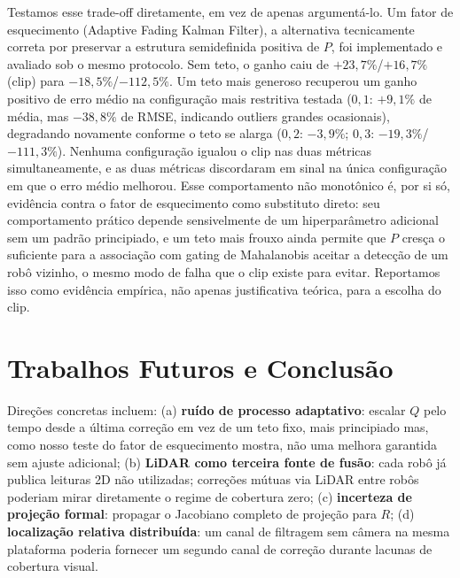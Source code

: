 \documentclass[runningheads]{llncs}
\renewcommand{\paragraph}[1]{\vspace{4pt}\noindent{\em #1}\enspace}
\begin{document}
Testamos esse trade-off diretamente, em vez de apenas argumentá-lo. Um
fator de esquecimento (Adaptive Fading Kalman Filter), a alternativa
tecnicamente correta por preservar a estrutura semidefinida positiva
de $P$, foi implementado e avaliado sob o mesmo protocolo. Sem teto, o
ganho caiu de $+23,7\%$/$+16,7\%$ (clip) para $-18,5\%$/$-112,5\%$. Um
teto mais generoso recuperou um ganho positivo de erro médio na
configuração mais restritiva testada ($0,1$: $+9,1\%$ de média, mas
$-38,8\%$ de RMSE, indicando outliers grandes ocasionais), degradando
novamente conforme o teto se alarga ($0,2$: $-3,9\%$; $0,3$:
$-19,3\%$/$-111,3\%$). Nenhuma configuração igualou o clip nas duas
métricas simultaneamente, e as duas métricas discordaram em sinal na
única configuração em que o erro médio melhorou. Esse comportamento
não monotônico é, por si só, evidência contra o fator de esquecimento
como substituto direto: seu comportamento prático depende
sensivelmente de um hiperparâmetro adicional sem um padrão
principiado, e um teto mais frouxo ainda permite que $P$ cresça o
suficiente para a associação com gating de Mahalanobis aceitar a
detecção de um robô vizinho, o mesmo modo de falha que o clip existe
para evitar. Reportamos isso como evidência empírica, não apenas
justificativa teórica, para a escolha do clip.

\section{Trabalhos Futuros e Conclusão}

\paragraph{Trabalhos futuros.}
\label{sec:future-work}
Direções concretas incluem: (a) \textbf{ruído de processo adaptativo}:
escalar $Q$ pelo tempo desde a última correção em vez de um teto fixo,
mais principiado mas, como nosso teste do fator de esquecimento
mostra, não uma melhora garantida sem ajuste adicional; (b)
\textbf{LiDAR como terceira fonte de fusão}: cada robô já publica
leituras 2D não utilizadas; correções mútuas via LiDAR entre robôs
poderiam mirar diretamente o regime de cobertura zero; (c)
\textbf{incerteza de projeção formal}: propagar o Jacobiano completo
de projeção para $R$; (d) \textbf{localização relativa distribuída}:
um canal de filtragem sem câmera na mesma plataforma poderia fornecer
um segundo canal de correção durante lacunas de cobertura visual.
\end{document}
